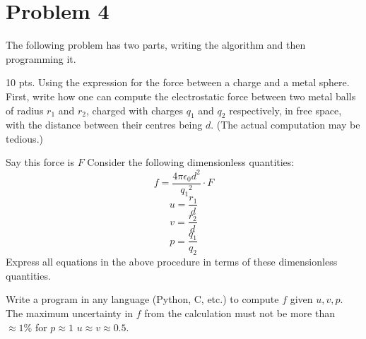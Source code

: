 
\section*{Problem 4}

\begin{problem}

The following problem has two parts, writing the algorithm and then programming it.
\end{problem}


\begin{subpr}{\hfill 10 pts.} Using the expression for the force between a charge and a metal sphere. First, write how one can compute the electrostatic force between two metal balls of radius $r_1$ and $r_2$, charged with charges $q_1$ and $q_2$ respectively, in free space, with the distance between their centres being $d$. (The actual computation may be tedious.)

Say this force is $F$ Consider the following dimensionless quantities: 
$$f=\frac{4 \pi \epsilon_0 d^2}{{q_1}^2}\cdot F$$
$$u=\frac{r_1}{d}$$
$$v=\frac{r_2}{d}$$
$$p=\frac{q_1}{q_2}$$
Express all equations in the above procedure in terms of these dimensionless quantities.

Write a program in any language (Python, C, etc.) to compute $f$ given $u,v,p.$ The maximum uncertainty in $f$ from the calculation must not be more than $\approx 1\%$ for $p \approx 1$ $u  \approx v \approx 0.5.$
\end{subpr}
\clearpage

